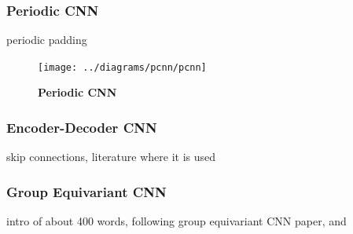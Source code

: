 \subsubsection{Periodic CNN}
periodic padding

\begin{figure}[H]
	\centering
	\texttt{[image: ../diagrams/pcnn/pcnn]}
	\caption[Periodic CNN]{\textbf{Periodic CNN}}
	\label{fig:pcnn}
\end{figure}

\subsubsection{Encoder-Decoder CNN} %
skip connections, literature where it is used

\subsubsection{Group Equivariant CNN} %
intro of about 400 words, following group equivariant CNN paper, and 

\newpage
